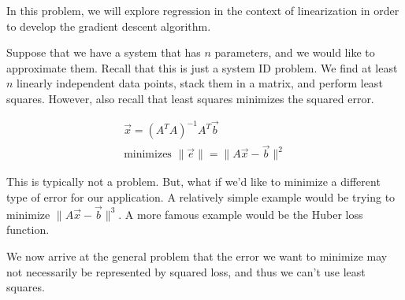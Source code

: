 

In this problem, we will explore regression in the context of linearization in order to develop the gradient descent algorithm.

Suppose that we have a system that has $n$ parameters, and we would like to approximate them.
Recall that this is just a system ID problem. We find at least $n$ linearly independent data points, stack them in a matrix, and perform least squares. However, also recall that least squares minimizes the squared error.

\begin{align*}
\vec{x} = (A^{T}A)^{-1}A^{T}\vec{b} \\
\text{minimizes } \lVert \vec{e} \rVert = \lVert A\vec{x} - \vec{b} \rVert ^{2}
\end{align*}

This is typically not a problem. But, what if we'd like to minimize a different type of error for our application.
A relatively simple example would be trying to minimize $\lVert A\vec{x} - \vec{b} \rVert ^{3}$.
A more famous example would be the Huber loss function.

We now arrive at the general problem that the error we want to minimize may not necessarily be represented by squared loss, and thus we can't use least squares.

